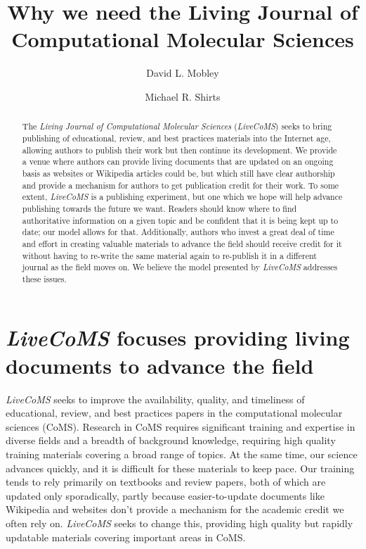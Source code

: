 \documentclass[9pt]{livecoms}
\title{Why we need the Living Journal of Computational Molecular Sciences}
\author[1*]{David L. Mobley}
\author[2*]{Michael R. Shirts}
\affil[1]{Department of Pharmaceutical Sciences and Chemistry, University of California, Irvine}
\affil[2]{Department of Chemical and Biological Engineering, University of Colorado Boulder}
\begin{document}
\maketitle

\begin{abstract}
The \emph{Living Journal of Computational Molecular Sciences} (\emph{LiveCoMS}) seeks to bring publishing of educational, review, and best practices materials into the Internet age, allowing authors to publish their work but then continue its development.
We provide a venue where authors can provide living documents that are updated on an ongoing basis as websites or Wikipedia articles could be, but which still have clear authorship and provide a mechanism for authors to get publication credit for their work.
To some extent, \emph{LiveCoMS} is a publishing experiment, but one which we hope will help advance publishing towards the future we want.
Readers should know where to find authoritative information on a given topic and be confident that it is being kept up to date; our model allows for that. 
Additionally, authors who invest a great deal of time and effort in creating valuable materials to advance the field should receive credit for it without having to re-write the same material again to re-publish it in a different journal as the field moves on. 
We believe the model presented by \emph{LiveCoMS} addresses these issues.
\end{abstract}


\section{\emph{LiveCoMS} focuses providing living documents to advance the field}

\emph{LiveCoMS} seeks to improve the availability, quality, and timeliness of educational, review, and best practices papers in the computational molecular sciences (CoMS).
Research in CoMS requires significant training and expertise in diverse fields and a breadth of background knowledge, requiring high quality training materials covering a broad range of topics.
At the same time, our science advances quickly, and it is difficult for these materials to keep pace. 
Our training tends to rely primarily on textbooks and review papers, both of which are updated only sporadically, partly because easier-to-update documents like Wikipedia and websites don't provide a mechanism for the academic credit we often rely on.
\emph{LiveCoMS} seeks to change this, providing high quality but rapidly updatable materials covering important areas in CoMS.
\end{document}
